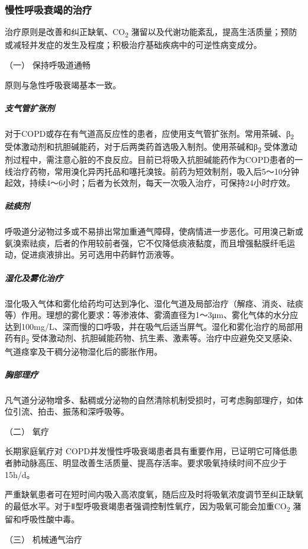 \subsubsection{慢性呼吸衰竭的治疗}

治疗原则是改善和纠正缺氧、CO\textsubscript{2}
潴留以及代谢功能紊乱，提高生活质量；预防或减轻并发症的发生及程度；积极治疗基础疾病中的可逆性病变成分。

\hypertarget{text00076.htmlux5cux23CHP3-4-3-2-1}{}
（一） 保持呼吸道通畅

原则与急性呼吸衰竭基本一致。

\subparagraph{支气管扩张剂}

对于COPD或存在有气道高反应性的患者，应使用支气管扩张剂。常用茶碱、β\textsubscript{2}
受体激动剂和抗胆碱能药，对于后两类药首选吸入制剂。使用茶碱和β\textsubscript{2}
受体激动剂过程中，需注意心脏的不良反应。目前已将吸入抗胆碱能药作为COPD患者的一线治疗药物，常用溴化异丙托品和噻托溴铵。前药为短效制剂，吸入后5～10分钟起效，持续4～6小时；后者为长效剂，每天一次吸入治疗，可保持24小时疗效。

\subparagraph{祛痰剂}

呼吸道分泌物过多或不易排出常加重通气障碍，使病情进一步恶化。可用溴己新或氨溴索祛痰，后者的作用较前者强，它不仅降低痰液黏度，而且增强黏膜纤毛运动，促进痰液排出。另可选用中药鲜竹沥液等。

\subparagraph{湿化及雾化治疗}

湿化吸入气体和雾化给药均可达到净化、湿化气道及局部治疗（解痉、消炎、祛痰等）作用。理想的雾化要求：等渗液体、雾滴直径为1～3μm、雾化气体的水分应达到100mg/L、深而慢的口呼吸，并在吸气后适当屏气。湿化和雾化治疗的局部用药有β\textsubscript{2}
受体激动剂、抗胆碱能药物、抗生素、激素等。治疗中应避免交叉感染、气道痉挛及干稠分泌物湿化后的膨胀作用。

\subparagraph{胸部理疗}

凡气道分泌物增多、黏稠或分泌物的自然清除机制受损时，可考虑胸部理疗，如体位引流、拍击、振荡和深呼吸等。

\hypertarget{text00076.htmlux5cux23CHP3-4-3-2-2}{}
（二） 氧疗

长期家庭氧疗对
COPD并发慢性呼吸衰竭患者具有重要作用，已证明它可降低患者肺动脉高压、明显改善生活质量、提高存活率。要求吸氧持续时间不应少于15h/d。

严重缺氧患者可在短时间内吸入高浓度氧，随后应及时将吸氧浓度调节至纠正缺氧的最低水平。对于Ⅱ型呼吸衰竭患者强调控制性氧疗，因为吸氧可能会加重CO\textsubscript{2}
潴留和呼吸性酸中毒。

\hypertarget{text00076.htmlux5cux23CHP3-4-3-2-3}{}
（三） 机械通气治疗

